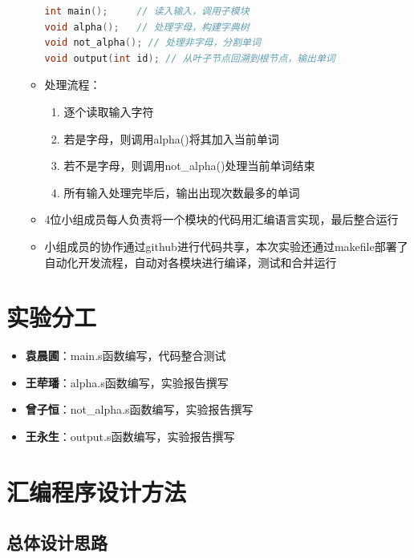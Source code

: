 \documentclass[10pt,a4paper]{article}
\begin{document}
\begin{itemize}
\begin{itemize}
        \begin{lstlisting}[language=C]
int main();     // 读入输入，调用子模块
void alpha();   // 处理字母，构建字典树
void not_alpha(); // 处理非字母，分割单词
void output(int id); // 从叶子节点回溯到根节点，输出单词
        \end{lstlisting}
        
        \item 处理流程：
        \begin{enumerate}
            \item 逐个读取输入字符
            \item 若是字母，则调用alpha()将其加入当前单词
            \item 若不是字母，则调用not\_alpha()处理当前单词结束
            \item 所有输入处理完毕后，输出出现次数最多的单词
        \end{enumerate}
        
        \item 4位小组成员每人负责将一个模块的代码用汇编语言实现，最后整合运行
        \item 小组成员的协作通过github进行代码共享，本次实验还通过makefile部署了自动化开发流程，自动对各模块进行编译，测试和合并运行
    \end{itemize}
\end{itemize}

\section{实验分工}

\begin{itemize}
    \item \textbf{袁晨圃}：main.s函数编写，代码整合测试
    \item \textbf{王荦璠}：alpha.s函数编写，实验报告撰写
    \item \textbf{曾子恒}：not\_alpha.s函数编写，实验报告撰写
    \item \textbf{王永生}：output.s函数编写，实验报告撰写
\end{itemize}

\section{汇编程序设计方法}

\subsection{总体设计思路}
\end{document}
